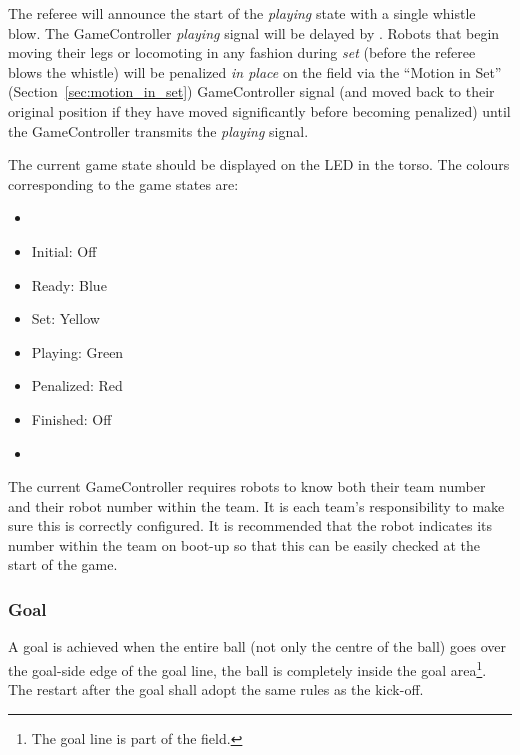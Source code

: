 The referee will announce the start of the \emph{playing} state with a single whistle blow.
The GameController \emph{playing} signal will be delayed by \PlayingDelayTime.
Robots that begin moving their legs or locomoting in any fashion during \emph{set} (\ie before the referee blows the whistle) will be penalized \textit{in place} on the field via the ``Motion in Set'' (\cf Section~\ref{sec:motion_in_set}) GameController signal (and moved back to their original position if they have moved significantly before becoming penalized) until the GameController transmits the \emph{playing} signal.

The current game state should be displayed on the LED in the torso. The colours corresponding to the game states are:

\begin{itemize}
    \item {}

	\item Initial: Off
	
	\item Ready: Blue
	
	\item Set: Yellow
	
	\item Playing: Green
	
	\item Penalized: Red
	
	\item Finished: Off

    \item {}
\end{itemize}

The current GameController requires robots to know both their team number and their robot number within the team. It is each team's responsibility to make sure this is correctly configured. It is recommended that the robot indicates its number within the team on boot-up so that this can be easily checked at the start of the game.

\subsubsection{Goal}
\label{sec:goal}
A goal  is achieved when the entire ball (not only the centre of the ball) goes over the goal-side edge of the goal line, \ie the ball is completely inside the goal area\footnote{The goal line is part of the field.}. The restart after the goal shall adopt the same rules as the kick-off.

